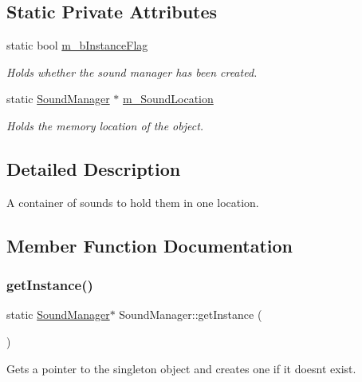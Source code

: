 \subsection*{Static Private Attributes}
\begin{DoxyCompactItemize}
\item 
static bool \hyperlink{class_sound_manager_aaa20c7fb691b35169bda8f6bb5332b78}{m\+\_\+b\+Instance\+Flag}
\begin{DoxyCompactList}\small\item\em Holds whether the sound manager has been created. \end{DoxyCompactList}\item 
static \hyperlink{class_sound_manager}{Sound\+Manager} $\ast$ \hyperlink{class_sound_manager_a2917e26757921e604323c90b7a88fce3}{m\+\_\+\+Sound\+Location}
\begin{DoxyCompactList}\small\item\em Holds the memory location of the object. \end{DoxyCompactList}\end{DoxyCompactItemize}


\subsection{Detailed Description}
A container of sounds to hold them in one location. 

\subsection{Member Function Documentation}
\mbox{\label{class_sound_manager_a9833fc5e9b1c06e900af63eade30bcd8}} 
\subsubsection{\texorpdfstring{get\+Instance()}{getInstance()}}
{\footnotesize\ttfamily static \hyperlink{class_sound_manager}{Sound\+Manager}$\ast$ Sound\+Manager\+::get\+Instance (\begin{DoxyParamCaption}{ }\end{DoxyParamCaption})\hspace{0.3cm}{\ttfamily [static]}}



Gets a pointer to the singleton object and creates one if it doesnt exist. 

